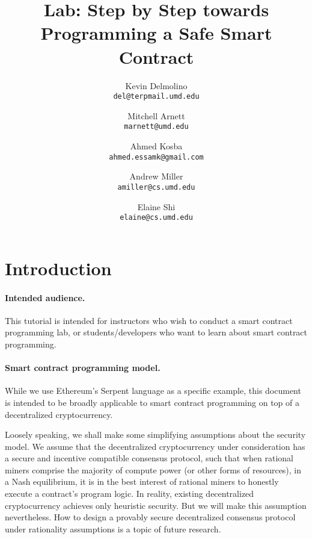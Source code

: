 \documentclass[12pt]{article}
\begin{document}
\title{Lab: Step by Step towards Programming a Safe Smart Contract}

\author{
  Kevin Delmolino\\
  \texttt{del@terpmail.umd.edu}
  \and
  Mitchell Arnett\\
  \texttt{marnett@umd.edu}
  \and
  Ahmed Kosba\\
  \texttt{ahmed.essamk@gmail.com}
  \and
  Andrew Miller\\
  \texttt{amiller@cs.umd.edu}
  \and
  Elaine Shi\\
  \texttt{elaine@cs.umd.edu}
}

\maketitle

\setcounter{tocdepth}{5}
\tableofcontents

\newpage
\section{Introduction}

\paragraph{Intended audience.}
This tutorial is intended for instructors
who wish to conduct a smart  
contract programming lab, or students/developers
who want to learn about smart contract programming.


\paragraph{Smart contract programming model.}
While we use Ethereum's Serpent language as a specific example,
this document is 
intended to be broadly applicable to 
smart contract programming on top of a decentralized cryptocurrency.

Loosely speaking, we shall make some simplifying assumptions 
about the security model. 
We assume that the decentralized
cryptocurrency under consideration has a secure and incentive compatible
consensus protocol, such that when
rational miners comprise the majority of compute
power (or other forms of resources),
in a Nash equilibrium, it is in the best interest
of rational miners to honestly execute a
contract's program logic.
In reality, existing decentralized cryptocurrency
achieves only heuristic security. But we will make this assumption
nevertheless. How to design a provably  
secure decentralized consensus protocol under
rationality assumptions is a topic of 
future research.
\end{document}
